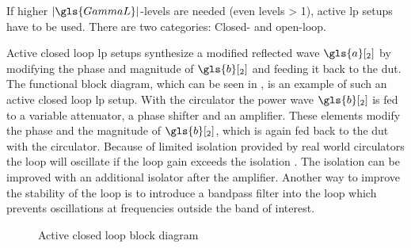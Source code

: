 \documentclass[12pt,a4paper,parskip=full,abstract=true,BCOR=12mm]{scrreprt}
\providecommand{\abs}[1]{\lvert#1\rvert}
\begin{document}
If higher $\abs{\gls{GammaL}}$-levels  are needed (even levels \num{> 1}), active \gls{lp} setups
have to be used. There are two categories: Closed- and open-loop.

Active closed loop \gls{lp} setups synthesize a modified reflected wave $\gls{a}[_2]$ by
modifying the phase and magnitude of $\gls{b}[_2]$ and feeding it back to the \gls{dut}.
The functional block diagram, which can be seen in ,
is an example of such an active closed loop \gls{lp} setup. With the circulator
the power wave $\gls{b}[_2]$ is fed to a variable attenuator, a phase shifter and an
amplifier. These elements modify the phase and the magnitude of $\gls{b}[_2]$,
which is again fed back to the \gls{dut} with the circulator. Because of limited
isolation provided by real world circulators the loop will oscillate if the loop gain
exceeds the isolation \cite{ghannouchi_load-pull_2013}. The isolation can be improved
with an additional isolator after the amplifier. Another way to improve the stability of the loop
is to introduce a bandpass filter into the loop which prevents oscillations at frequencies
outside the band of interest.

\begin{figure}[htb]
    \centering
    \caption{Active closed loop  block diagram}
    \label{fig:active_closed_loop}
\end{figure}
\end{document}
